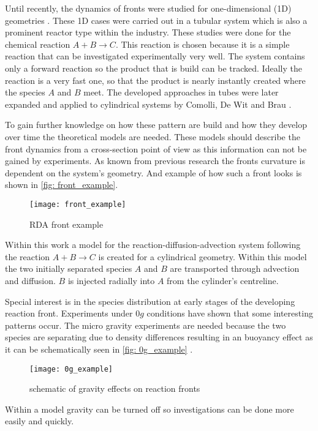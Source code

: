 \documentclass[../thesis.tex]{subfiles}
\begin{document}
Until recently, the dynamics of fronts were studied for one-dimensional (1D) geometries \cite{PhysRevA.38.3151}. These 1D cases were carried out in a tubular system which is also a prominent reactor type within the industry. These studies were done for the chemical reaction $ A+B \rightarrow C$. This reaction is chosen because it is a simple reaction that can be investigated experimentally very well. The system contains only a forward reaction so the product that is build can be tracked. Ideally the reaction is a very fast one, so that the product is nearly instantly created where the species $A$ and $B$ meet. The developed approaches in tubes were later expanded and applied to cylindrical systems by Comolli, De Wit and Brau \cite{comolli2021dynamics}.

To gain further knowledge on how these pattern are build and how they develop over time the theoretical models are needed. These models should describe the front dynamics from a cross-section point of view as this information can not be gained by experiments. As known from previous research the fronts curvature is dependent on the system's geometry. And example of how such a front looks is shown in \autoref{fig: front_example}.
\begin{figure}[htbp]
	\centering
	\texttt{[image: front\_example]}
	\caption{RDA front example}
	\label{fig: front_example}
\end{figure}
Within this work a model for the reaction-diffusion-advection system following the reaction $ A+B \rightarrow C$ is created for a cylindrical geometry. Within this model the two initially separated species $A$ and $B$ are transported through advection and diffusion. $B$ is injected radially into $A$ from the cylinder's centreline. 

Special interest is in the species distribution at early stages of the developing reaction front. Experiments under $0g$ conditions have shown that some interesting patterns occur. The micro gravity experiments are needed because the two species are separating due to density differences resulting in an buoyancy effect as it can be schematically seen in \autoref{fig: 0g_example} \cite{stergiou2022effects}.
\begin{figure}[htbp]
	\centering
	\texttt{[image: 0g\_example]}
	\caption{schematic of gravity effects on reaction fronts}
	\label{fig: 0g_example}
\end{figure}
Within a model gravity can be turned off so investigations can be done more easily and quickly.
\end{document}
